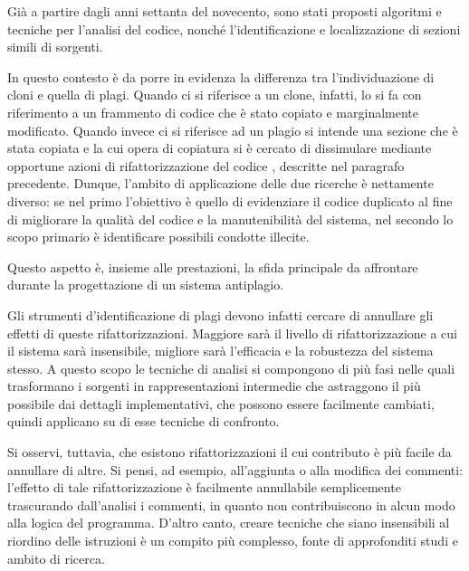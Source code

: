 Già a partire dagli anni settanta del novecento, sono stati proposti algoritmi e tecniche per l'analisi del codice, nonché l'identificazione e localizzazione di sezioni simili di sorgenti.

In questo contesto è da porre in evidenza la differenza tra l'individuazione di cloni e quella di plagi.
%
Quando ci si riferisce a un clone, infatti, lo si fa con riferimento a un frammento di codice che è stato copiato e marginalmente modificato. 
%
Quando invece ci si riferisce ad un plagio si intende una sezione che è stata copiata e la cui opera di copiatura si è cercato di dissimulare mediante opportune azioni di rifattorizzazione del codice \cite{cpdp}, descritte nel paragrafo precedente.
%
Dunque, l'ambito di applicazione delle due ricerche è nettamente diverso: se nel primo l'obiettivo è quello di evidenziare il codice duplicato al fine di migliorare la qualità del codice e la manutenibilità del sistema, nel secondo lo scopo primario è identificare possibili condotte illecite.

Questo aspetto è, insieme alle prestazioni, la sfida principale da affrontare durante la progettazione di un sistema antiplagio.

Gli strumenti d'identificazione di plagi devono infatti cercare di annullare gli effetti di queste rifattorizzazioni.
%
Maggiore sarà il livello di rifattorizzazione a cui il sistema sarà insensibile, migliore sarà l'efficacia e la robustezza del sistema stesso.
%
A questo scopo le tecniche di analisi si compongono di più fasi nelle quali trasformano i sorgenti in rappresentazioni intermedie che astraggono il più possibile dai dettagli implementativi, che possono essere facilmente cambiati, quindi applicano su di esse tecniche di confronto.

Si osservi, tuttavia, che esistono rifattorizzazioni il cui contributo è più facile da annullare di altre. 
%
Si pensi, ad esempio, all'aggiunta o alla modifica dei commenti: l'effetto di tale rifattorizzazione è facilmente annullabile semplicemente trascurando dall'analisi i commenti, in quanto non contribuiscono in alcun modo alla logica del programma. 
%
D'altro canto, creare tecniche che siano insensibili al riordino delle istruzioni è un compito più complesso, fonte di approfonditi studi e ambito di ricerca.


